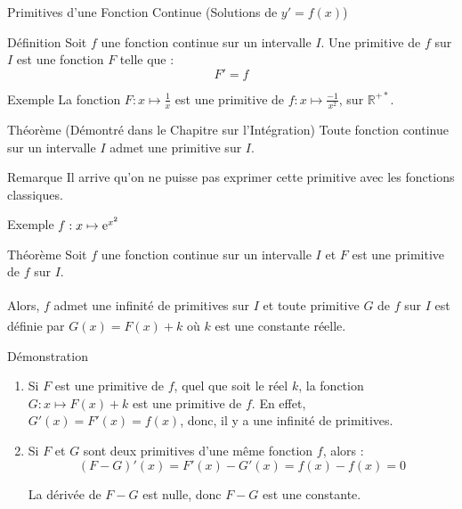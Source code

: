 \documentclass{coursbook}
\begin{document}
    \begin{Gpartie}{Primitives d'une Fonction Continue \big(Solutions de $y'=f(x)$\big)} 
        \begin{Spartie}{Définition} 
            Soit $f$ une fonction continue sur un intervalle $I$. Une primitive de $f$ sur $I$ est une fonction $F$ telle que :
            \[F'=f\]
        \end{Spartie}
        \begin{Spartie}{Exemple} 
            La fonction $F:x\mapsto\frac{1}{x}$ est une primitive de $f:x\mapsto\frac{-1}{x^2}$, sur $\mathbb{R^{+*}}$.
        \end{Spartie}
        \begin{Spartie}{Théorème (Démontré dans le Chapitre sur l'Intégration)} 
            Toute fonction continue sur un intervalle $I$ admet une primitive sur $I$.
        \end{Spartie}
        \begin{Spartie}{Remarque} 
            Il arrive qu'on ne puisse pas exprimer cette primitive avec les fonctions classiques.
            \begin{SSpartie}{Exemple} 
                $f:x\mapsto \mathrm{e}^{x^2}$
            \end{SSpartie}
        \end{Spartie}
        \begin{Spartie}{Théorème} 
            Soit $f$ une fonction continue sur un intervalle $I$ et $F$ est une primitive de $f$ sur $I$.

            Alors, $f$ admet une infinité de primitives sur $I$\textsuperscript{} et toute primitive $G$ de $f$ sur $I$ est définie par $G(x)=F(x)+k$\textsuperscript{} où $k$ est une constante réelle.

            \begin{SSpartie}{Démonstration} 
                \begin{enumerate}
                    \item Si $F$ est une primitive de $f$, quel que soit le réel $k$, la fonction $G:x\mapsto F(x)+k$ est une primitive de $f$. En effet, $G'(x)=F'(x)=f(x)$, donc, il y a une infinité de primitives.
                    \item Si $F$ et $G$ sont deux primitives d'une même fonction $f$, alors :
                    \[(F-G)'(x)=F'(x)-G'(x)=f(x)-f(x)=0\]
    
                    La dérivée de $F-G$ est nulle, donc $F-G$ est une constante.
    

\end{enumerate}
\end{SSpartie}
\end{Spartie}
\end{Gpartie}
\end{document}
